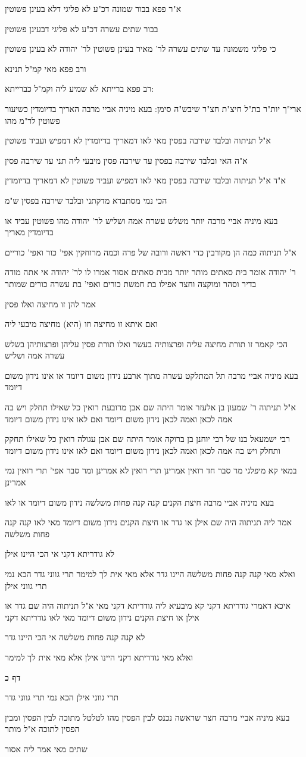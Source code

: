 \documentclass[12pt, openany]{book}
\newcommand{\sethebfont}{
\fontsize{10.5pt}{21.0pt} \selectfont
}
\newcommand{\textblock}[1]{
{\sethebfont #1\\}	
}
\newcommand{\sectname}{}
\newcommand{\newsection}[1]{
	\addcontentsline{toc}{section}{#1}
	\renewcommand{\sectname}{#1}	
	\vspace{-\baselineskip}
	\begin{center}
		\textbf{%
\fontsize{16pt}{16pt}\selectfont
			#1}
	\end{center}
	\vspace{-\baselineskip}
	\nopagebreak
}
\begin{document}
\textblock{א"ר פפא בבור שמונה דכ"ע לא פליגי דלא בעינן פשוטין}
\textblock{בבור שתים עשרה דכ"ע לא פליגי דבעינן פשוטין}
\textblock{כי פליגי משמונה עד שתים עשרה לר' מאיר בעינן פשוטין לר' יהודה לא בעינן פשוטין}
\textblock{ורב פפא מאי קמ"ל תנינא}
\textblock{רב פפא ברייתא לא שמיע ליה וקמ"ל כברייתא:}
\textblock{ארי"ך יות"ר בת"ל חיצ"ת חצ"ר שיבש"ה סימן: בעא מיניה אביי מרבה האריך בדיומדין כשיעור פשוטין לר"מ מהו}
\textblock{א"ל תניתוה ובלבד שירבה בפסין מאי לאו דמאריך בדיומדין לא דמפיש ועביד פשוטין}
\textblock{א"ה האי ובלבד שירבה בפסין עד שירבה פסין מיבעי ליה תני עד שירבה פסין}
\textblock{א"ד א"ל תניתוה ובלבד שירבה בפסין מאי לאו דמפיש ועביד פשוטין לא דמאריך בדיומדין}
\textblock{הכי נמי מסתברא מדקתני ובלבד שירבה בפסין ש"מ}
\textblock{בעא מיניה אביי מרבה יותר משלש עשרה אמה ושליש לר' יהודה מהו פשוטין עביד או בדיומדין מאריך}
\textblock{א"ל תניתוה כמה הן מקורבין כדי ראשה ורובה של פרה וכמה מרוחקין אפי' כור ואפי' כוריים}
\textblock{ר' יהודה אומר בית סאתים מותר יותר מבית סאתים אסור אמרו לו לר' יהודה אי אתה מודה בדיר וסהר ומוקצה וחצר אפילו בת חמשת כורים ואפי' בת עשרה כורים שמותר}
\textblock{אמר להן זו מחיצה ואלו פסין}
\textblock{ואם איתא זו מחיצה וזו (היא) מחיצה מיבעי ליה}
\textblock{הכי קאמר זו תורת מחיצה עליה ופרצותיה בעשר ואלו תורת פסין עליהן ופרצותיהן בשלש עשרה אמה ושליש}
\textblock{בעא מיניה אביי מרבה תל המתלקט עשרה מתוך ארבע נידון משום דיומד או אינו נידון משום דיומד}
\textblock{א"ל תניתוה ר' שמעון בן אלעזר אומר היתה שם אבן מרובעת רואין כל שאילו תחלק ויש בה אמה לכאן ואמה לכאן נידון משום דיומד ואם לאו אינו נידון משום דיומד}
\textblock{רבי ישמעאל בנו של רבי יוחנן בן ברוקה אומר היתה שם אבן עגולה רואין כל שאילו תחקק ותחלק ויש בה אמה לכאן ואמה לכאן נידון משום דיומד ואם לאו אינו נידון משום דיומד}
\textblock{במאי קא מיפלגי מר סבר חד רואין אמרינן תרי רואין לא אמרינן ומר סבר אפי' תרי רואין נמי אמרינן}
\textblock{בעא מיניה אביי מרבה חיצת הקנים קנה קנה פחות משלשה נידון משום דיומד או לאו}
\textblock{אמר ליה תניתוה היה שם אילן או גדר או חיצת הקנים נידון משום דיומד מאי לאו קנה קנה פחות משלשה}
\textblock{לא גודריתא דקני אי הכי היינו אילן}
\textblock{ואלא מאי קנה קנה פחות משלשה היינו גדר אלא מאי אית לך למימר תרי גווני גדר הכא נמי תרי גווני אילן}
\textblock{איכא דאמרי גודריתא דקני קא מיבעיא ליה גודריתא דקני מאי א"ל תניתוה היה שם גדר או אילן או חיצת הקנים נידון משום דיומד מאי לאו גודריתא דקני}
\textblock{לא קנה קנה פחות משלשה אי הכי היינו גדר}
\textblock{ואלא מאי גודריתא דקני היינו אילן אלא מאי אית לך למימר}
\newsection{דף כ}
\textblock{תרי גווני אילן הכא נמי תרי גווני גדר}
\textblock{בעא מיניה אביי מרבה חצר שראשה נכנס לבין הפסין מהו לטלטל מתוכה לבין הפסין ומבין הפסין לתוכה א"ל מותר}
\textblock{שתים מאי אמר ליה אסור}
\end{document}
